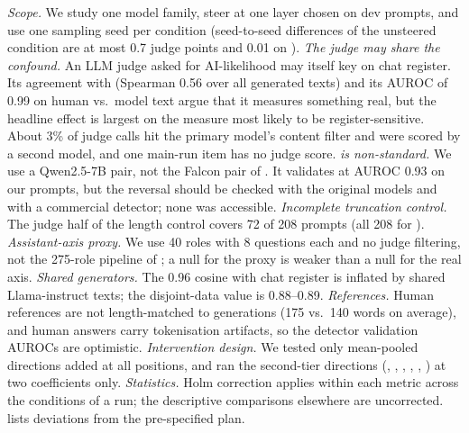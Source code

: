 {\em Scope.} We study one model family, steer at one layer chosen on dev prompts, and use one sampling seed per condition (seed-to-seed differences of the unsteered condition are at most 0.7 judge points and 0.01 on \desklib).
{\em The judge may share the confound.} An LLM judge asked for AI-likelihood may itself key on chat register. Its agreement with \desklib (Spearman 0.56 over all generated texts) and its AUROC of 0.99 on human vs.\ model text argue that it measures something real, but the headline effect is largest on the measure most likely to be register-sensitive. About 3\% of judge calls hit the primary model's content filter and were scored by a second model, and one main-run item has no judge score.
{\em \bino is non-standard.} We use a Qwen2.5-7B pair, not the Falcon pair of \citet{hans2024binoculars}. It validates at AUROC 0.93 on our prompts, but the reversal should be checked with the original models and with a commercial detector; none was accessible.
{\em Incomplete truncation control.} The judge half of the length control covers 72 of 208 prompts (all 208 for \desklib).
{\em Assistant-axis proxy.} We use 40 roles with 8 questions each and no judge filtering, not the 275-role pipeline of \citet{lu2026assistant}; a null for the proxy is weaker than a null for the real axis.
{\em Shared generators.} The 0.96 cosine with chat register is inflated by shared Llama-instruct texts; the disjoint-data value is 0.88--0.89.
{\em References.} Human references are not length-matched to generations (175 vs.\ 140 words on average), and \hcthree human answers carry tokenisation artifacts, so the detector validation AUROCs are optimistic.
{\em Intervention design.} We tested only mean-pooled directions added at all positions, and ran the second-tier directions (\ailr, \fluency, \lengthdir, \perppersona, \aibase, \aihc) at two coefficients only.
{\em Statistics.} Holm correction applies within each metric across the conditions of a run; the descriptive comparisons elsewhere are uncorrected.
 lists deviations from the pre-specified plan.
